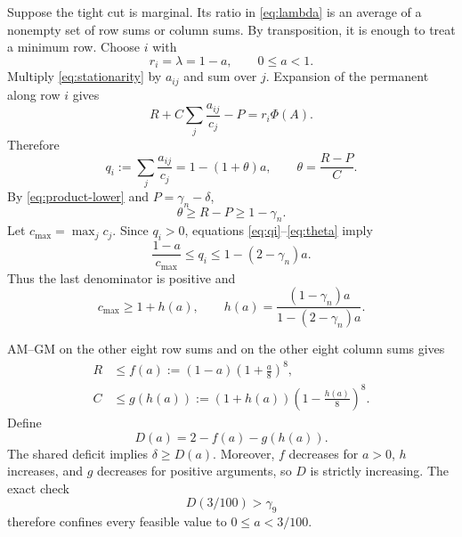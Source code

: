 \documentclass[11pt]{article}
\theoremstyle{remark}
\begin{document}
Suppose the tight cut is marginal.  Its ratio in \eqref{eq:lambda} is an
average of a nonempty set of row sums or column sums.  By transposition, it is
enough to treat a minimum row.  Choose $i$ with
\[
 r_i=\lambda=1-a,\qquad 0\le a<1.
\]
Multiply \eqref{eq:stationarity} by $a_{ij}$ and sum over $j$.  Expansion of
the permanent along row $i$ gives
\[
 R+C\sum_j\frac{a_{ij}}{c_j}-P=r_i\Phi(A).
\]
Therefore
\begin{equation}\label{eq:qi}
 q_i:=\sum_j\frac{a_{ij}}{c_j}
 =1-(1+\theta)a,
 \qquad \theta=\frac{R-P}{C}.
\end{equation}
By \eqref{eq:product-lower} and $P=\gamma_n-\delta$,
\begin{equation}\label{eq:theta}
 \theta\ge R-P\ge1-\gamma_n.
\end{equation}
Let $c_{\max}=\max_jc_j$.  Since $q_i>0$, equations
\eqref{eq:qi}--\eqref{eq:theta} imply
\[
 \frac{1-a}{c_{\max}}\le q_i\le1-(2-\gamma_n)a.
\]
Thus the last denominator is positive and
\begin{equation}\label{eq:h}
 c_{\max}\ge1+h(a),
 \qquad h(a)=\frac{(1-\gamma_n)a}{1-(2-\gamma_n)a}.
\end{equation}

AM--GM on the other eight row sums and on the other eight column sums gives
\begin{align}
 R&\le f(a):=(1-a)\left(1+\frac a8\right)^8,
 \label{eq:f}\\
 C&\le g(h(a)):=(1+h(a))\left(1-\frac{h(a)}8\right)^8.
 \label{eq:g}
\end{align}
Define
\begin{equation}\label{eq:D}
 D(a)=2-f(a)-g(h(a)).
\end{equation}
The shared deficit implies $\delta\ge D(a)$.  Moreover, $f$ decreases for
$a>0$, $h$ increases, and $g$ decreases for positive arguments, so $D$ is
strictly increasing.  The exact check
\begin{equation}\label{eq:D-endpoint}
 D(3/100)>\gamma_9
\end{equation}
therefore confines every feasible value to $0\le a<3/100$.
\end{document}
